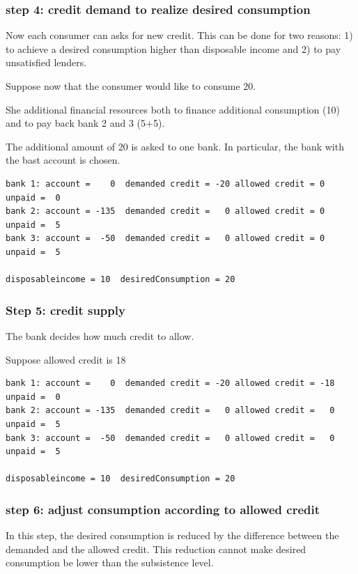 \documentclass{article}
\begin{document}
\subsubsection*{step 4: credit demand to realize desired consumption}
Now each consumer can asks for new credit. This can be done for two reasons: 1) to achieve a desired consumption higher than disposable income and 2) to pay unsatisfied lenders.

Suppose now that the consumer would like to consume 20.

She additional financial resources both to finance additional consumption (10) and to pay back bank 2 and 3 (5+5).

The additional amount of 20 is asked to one bank. In particular, the bank with the bast account is chosen. 

\begin{verbatim}
bank 1: account =    0  demanded credit = -20 allowed credit = 0 unpaid =  0
bank 2: account = -135  demanded credit =   0 allowed credit = 0 unpaid =  5
bank 3: account =  -50  demanded credit =   0 allowed credit = 0 unpaid =  5

disposableincome = 10  desiredConsumption = 20
\end{verbatim}


\subsubsection*{Step 5: credit supply}

The bank decides how much credit to allow.

Suppose allowed credit is 18

\begin{verbatim}
bank 1: account =    0  demanded credit = -20 allowed credit = -18 unpaid =  0
bank 2: account = -135  demanded credit =   0 allowed credit =   0 unpaid =  5
bank 3: account =  -50  demanded credit =   0 allowed credit =   0 unpaid =  5

disposableincome = 10  desiredConsumption = 20
\end{verbatim}

\subsubsection*{step 6: adjust consumption according to allowed credit}

In this step, the desired consumption is reduced by the difference between the demanded and the allowed credit. This reduction cannot make desired consumption be lower than the subsistence level.
\end{document}
